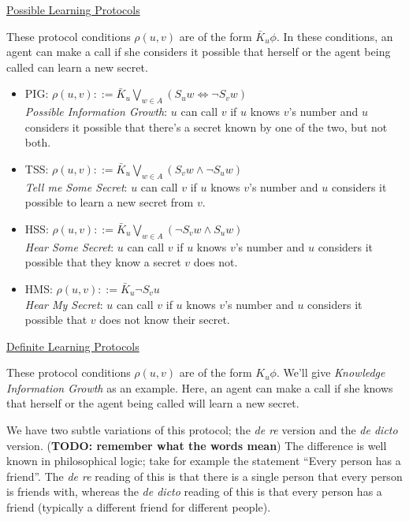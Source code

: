 \documentclass[12pt, a4paper]{article} %
\begin{document}
\hfill

\noindent \underline{Possible Learning Protocols}

These protocol conditions $\rho(u, v)$ are of the form $\bar K_u \phi$. In these conditions, an agent can make a call if she considers it possible that herself or the agent being called can learn a new secret.

\begin{itemize}
    \item \textsf{PIG}: $\rho(u, v) ::= \bar K_u \bigvee_{w \in A} \left(S_u w \iff \neg S_v w\right)$ \\ 
    \textit{Possible Information Growth}: $u$ can call $v$ if $u$ knows $v$'s number and $u$ considers it possible that there's a secret known by one of the two, but not both.
    \item \textsf{TSS}: $\rho(u, v) ::= \bar K_u \bigvee_{w \in A} \left(S_v w \land \neg S_u w\right)$ \\
    \textit{Tell me Some Secret}: $u$ can call $v$ if $u$ knows $v$'s number and $u$ considers it possible to learn a new secret from $v$.
    \item \textsf{HSS}: $\rho(u, v) ::= \bar K_u \bigvee_{w \in A} \left(\neg S_v w \land S_u w\right)$ \\
    \textit{Hear Some Secret}: $u$ can call $v$ if $u$ knows $v$'s number and $u$ considers it possible that they know a secret $v$ does not.
    \item \textsf{HMS}: $\rho(u, v) ::= \bar K_u \neg S_v u$ \\
    \textit{Hear My Secret}: $u$ can call $v$ if $u$ knows $v$'s number and $u$ considers it possible that $v$ does not know their secret.
\end{itemize}

\hfill 

\noindent \underline{Definite Learning Protocols}

These protocol conditions $\rho(u, v)$ are of the form $K_u \phi$. We'll give \textit{Knowledge Information Growth} as an example. Here, an agent can make a call if she knows that herself or the agent being called will learn a new secret. 

We have two subtle variations of this protocol; the \textit{de re} version and the \textit{de dicto} version. (\textbf{TODO: remember what the words mean}) The difference is well known in philosophical logic; take for example the statement ``Every person has a friend''. The \textit{de re} reading of this is that there is a single person that every person is friends with, whereas the \textit{de dicto} reading of this is that every person has a friend (typically a different friend for different people).
\end{document}
